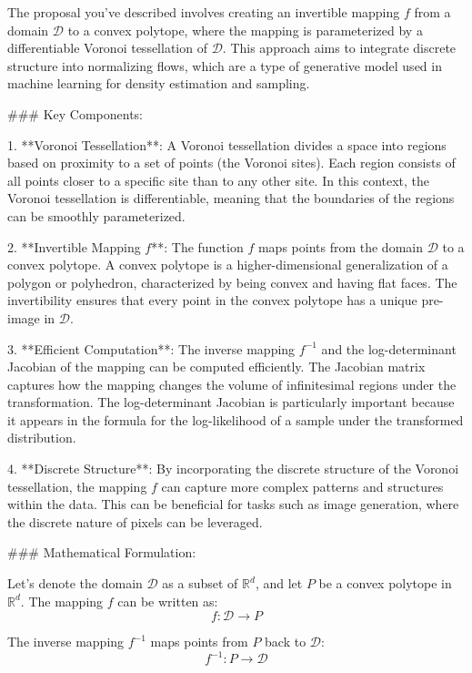 The proposal you've described involves creating an invertible mapping \( f \) from a domain \( \mathcal{D} \) to a convex polytope, where the mapping is parameterized by a differentiable Voronoi tessellation of \( \mathcal{D} \). This approach aims to integrate discrete structure into normalizing flows, which are a type of generative model used in machine learning for density estimation and sampling.

### Key Components:

1. **Voronoi Tessellation**: A Voronoi tessellation divides a space into regions based on proximity to a set of points (the Voronoi sites). Each region consists of all points closer to a specific site than to any other site. In this context, the Voronoi tessellation is differentiable, meaning that the boundaries of the regions can be smoothly parameterized.

2. **Invertible Mapping \( f \)**: The function \( f \) maps points from the domain \( \mathcal{D} \) to a convex polytope. A convex polytope is a higher-dimensional generalization of a polygon or polyhedron, characterized by being convex and having flat faces. The invertibility ensures that every point in the convex polytope has a unique pre-image in \( \mathcal{D} \).

3. **Efficient Computation**: The inverse mapping \( f^{-1} \) and the log-determinant Jacobian of the mapping can be computed efficiently. The Jacobian matrix captures how the mapping changes the volume of infinitesimal regions under the transformation. The log-determinant Jacobian is particularly important because it appears in the formula for the log-likelihood of a sample under the transformed distribution.

4. **Discrete Structure**: By incorporating the discrete structure of the Voronoi tessellation, the mapping \( f \) can capture more complex patterns and structures within the data. This can be beneficial for tasks such as image generation, where the discrete nature of pixels can be leveraged.

### Mathematical Formulation:

Let's denote the domain \( \mathcal{D} \) as a subset of \( \mathbb{R}^d \), and let \( P \) be a convex polytope in \( \mathbb{R}^d \). The mapping \( f \) can be written as:
\[ f: \mathcal{D} \rightarrow P \]

The inverse mapping \( f^{-1} \) maps points from \( P \) back to \( \mathcal{D} \):
\[ f^{-1}: P \rightarrow \mathcal{D} \]

